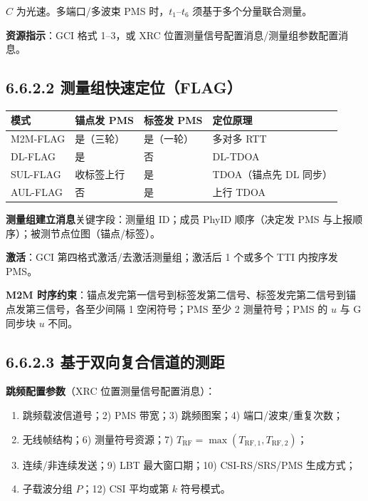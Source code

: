 \documentclass[11pt,a4paper]{ctexart}
\begin{document}
$C$ 为光速。多端口/多波束 PMS 时，$t_1$--$t_6$ 须基于多个分量联合测量。

\textbf{资源指示}：GCI 格式 1--3，或 XRC 位置测量信号配置消息/测量组参数配置消息。

\subsection{6.6.2.2 测量组快速定位（FLAG）}

\begin{table}[h]
\centering
\small
\begin{tabular}{llll}
\toprule
\textbf{模式} & \textbf{锚点发 PMS} & \textbf{标签发 PMS} & \textbf{定位原理} \\
\midrule
M2M-FLAG & 是（三轮） & 是（一轮） & 多对多 RTT \\
DL-FLAG & 是 & 否 & DL-TDOA \\
SUL-FLAG & 收标签上行 & 是 & TDOA（锚点先 DL 同步） \\
AUL-FLAG & 否 & 是 & 上行 TDOA \\
\bottomrule
\end{tabular}
\end{table}

\textbf{测量组建立消息}关键字段：测量组 ID；成员 PhyID 顺序（决定发 PMS 与上报顺序）；被测节点位图（锚点/标签）。

\textbf{激活}：GCI 第四格式激活/去激活测量组；激活后 1 个或多个 TTI 内按序发 PMS。

\textbf{M2M 时序约束}：锚点发完第一信号到标签发第二信号、标签发完第二信号到锚点发第三信号，各至少间隔 1 空闲符号；PMS 至少 2 测量符号；PMS 的 $u$ 与 G 同步块 $u$ 不同。

\subsection{6.6.2.3 基于双向复合信道的测距}

\textbf{跳频配置参数}（XRC 位置测量信号配置消息）：
\begin{enumerate}[nosep]
  \item 跳频载波信道号；2) PMS 带宽；3) 跳频图案；4) 端口/波束/重复次数；
  \item 无线帧结构；6) 测量符号资源；7) $T_{\mathrm{RF}}=\max(T_{\mathrm{RF},1},T_{\mathrm{RF},2})$；
  \item 连续/非连续发送；9) LBT 最大窗口期；10) CSI-RS/SRS/PMS 生成方式；
  \item 子载波分组 $P$；12) CSI 平均或第 $k$ 符号模式。
\end{enumerate}
\end{document}
